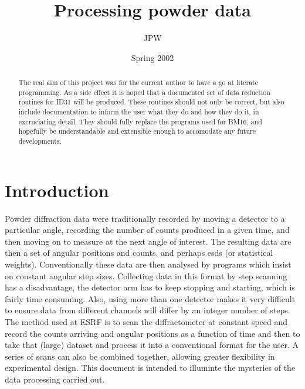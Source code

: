 \documentclass[10pt,a4paper,notitlepage]{article}
\begin{document}
\marginsize{2cm}{2cm}{2cm}{2cm} %
\pagestyle{headings}            %

\title{Processing powder data}
\author{JPW}
\date{Spring 2002}
\maketitle

\begin{abstract}
The real aim of this project was for the current author 
to have a go at literate programming. As a side effect it is hoped that a 
documented set of data reduction routines for ID31 will be produced. These  
routines should not only be correct, but also include documentation to 
inform the user what they do and how they do it, in excruciating detail. 
They should fully replace the programs used for BM16, and hopefully be
understandable and extensible enough to accomodate any future developments.
\end{abstract}

\tableofcontents


\section{Introduction}


Powder diffraction data were traditionally recorded by moving a detector 
to a particular angle, recording the number of counts produced in a given 
time, and then moving on to measure at the next angle of interest. 
The resulting data are then a set of angular positions 
and counts, and perhaps esds (or statistical weights).
Conventionally these data are then analysed 
by programs which insist on constant angular step sizes. 
Collecting data in this format by step scanning has a disadvantage,  
the detector arm has to keep stopping and starting, which is fairly 
time consuming. 
Also, using more than one detector makes it very difficult to ensure 
data from different channels will differ by an integer number of steps.
The method used at ESRF is to scan the diffractometer at constant speed 
and record the counts arriving and angular positions as a
function of time and then to take that (large) dataset and process it 
into a conventional format for the user. 
A series of scans can also be combined together, allowing greater 
flexibility in experimental design. 
This document is intended to illuminte the mysteries of the data 
processing carried out.
\end{document}
